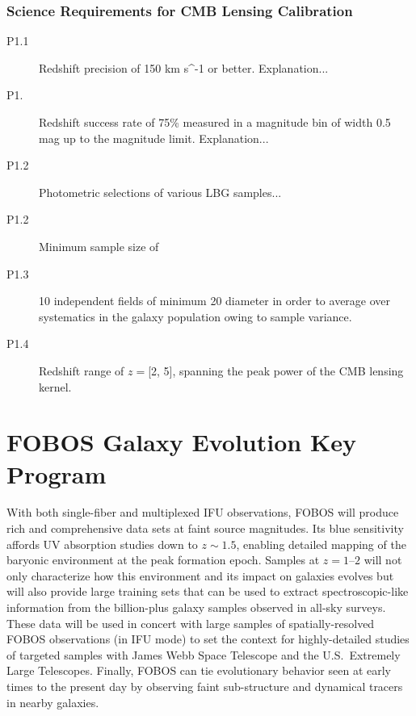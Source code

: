 \documentclass[preprint,11pt]{aastex}
\newcommand{\kms}{{\rm km s^{-1}}}
\begin{document}
\subsubsection{Science Requirements for CMB Lensing Calibration}

\begin{description}

\item[P1.1] Redshift precision of 150 \kms{} or better.  Explanation...

\item[P1.]  Redshift success rate of 75\% measured in a magnitude bin of width 0.5 mag up to the magnitude limit.  Explanation...

\item[P1.2] Photometric selections of various LBG samples...

\item[P1.2] Minimum sample size of 

\item[P1.3] 10 independent fields of minimum 20\arcmin{} diameter in order to average over systematics in the galaxy population owing to sample variance.

\item[P1.4] Redshift range of $z = $[2, 5], spanning the peak power of the CMB lensing kernel.

\end{description}

\newpage
\section{FOBOS Galaxy Evolution Key Program} \label{sec:galaxies}

With both single-fiber and multiplexed IFU observations, FOBOS will produce rich and comprehensive data sets at faint source magnitudes.  Its blue sensitivity affords UV absorption studies down to $z \sim 1.5$, enabling detailed mapping of the baryonic environment at the peak formation epoch.  Samples at $z=1$--$2$ will not only characterize how this environment and its impact on galaxies evolves but will also provide large training sets that can be used to extract spectroscopic-like information from the billion-plus galaxy samples observed in all-sky surveys.  These data will be used in concert with large samples of spatially-resolved FOBOS observations (in IFU mode) to set the context for highly-detailed studies of targeted samples with James Webb Space Telescope and the U.S.~Extremely Large Telescopes.  Finally, FOBOS can tie evolutionary behavior seen at early times to the present day by observing faint sub-structure and dynamical tracers in nearby galaxies.
\end{document}
